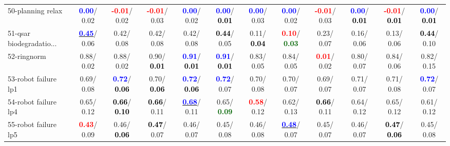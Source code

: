 \begin{table}[h]
\begin{center}
{\begin{tabular}{lc|c|c|c|c|c|c|c|c|c|c}
50-planning relax & \textcolor{blue}{\textbf{  0.00}}/  0.02 & \textcolor{red}{\textbf{ -0.01}}/  0.02 & \textcolor{red}{\textbf{ -0.01}}/  0.03 & \textcolor{blue}{\textbf{  0.00}}/  0.02 & \textcolor{blue}{\textbf{  0.00}}/\textcolor{black}{\textbf{  0.01}} & \textcolor{blue}{\textbf{  0.00}}/  0.03 & \textcolor{blue}{\textbf{  0.00}}/  0.02 & \textcolor{red}{\textbf{ -0.01}}/  0.03 & \textcolor{blue}{\textbf{  0.00}}/\textcolor{black}{\textbf{  0.01}} & \textcolor{red}{\textbf{ -0.01}}/\textcolor{black}{\textbf{  0.01}} & \textcolor{blue}{\textbf{  0.00}}/\textcolor{black}{\textbf{  0.01}} \\
51-qsar biodegradatio... & \underline{\textcolor{blue}{\textbf{  0.45}}}/  0.06 &   0.42/  0.08 &   0.42/  0.08 &   0.42/  0.08 & \textcolor{black}{\textbf{  0.44}}/  0.05 &   0.11/\textcolor{black}{\textbf{  0.04}} & \textcolor{red}{\textbf{  0.10}}/\textcolor{darkgreen}{\textbf{  0.03}} &   0.23/  0.07 &   0.16/  0.06 &   0.13/  0.06 & \textcolor{black}{\textbf{  0.44}}/  0.10 \\
52-ringnorm &   0.88/  0.02 &   0.88/  0.02 &   0.90/\textcolor{black}{\textbf{  0.01}} & \textcolor{blue}{\textbf{  0.91}}/\textcolor{black}{\textbf{  0.01}} & \textcolor{blue}{\textbf{  0.91}}/\textcolor{black}{\textbf{  0.01}} &   0.83/  0.05 &   0.84/  0.05 & \textcolor{red}{\textbf{  0.01}}/  0.02 &   0.80/  0.07 &   0.84/  0.06 &   0.82/  0.15 \\
53-robot failure lp1 &   0.69/  0.08 & \textcolor{blue}{\textbf{  0.72}}/\textcolor{black}{\textbf{  0.06}} &   0.70/\textcolor{black}{\textbf{  0.06}} & \textcolor{blue}{\textbf{  0.72}}/\textcolor{black}{\textbf{  0.06}} & \textcolor{blue}{\textbf{  0.72}}/  0.07 &   0.70/  0.08 &   0.70/  0.07 &   0.69/  0.07 &   0.71/  0.07 &   0.71/  0.08 & \textcolor{blue}{\textbf{  0.72}}/  0.07 \\ \hline
54-robot failure lp4 &   0.65/  0.12 & \textcolor{black}{\textbf{  0.66}}/\textcolor{black}{\textbf{  0.10}} & \textcolor{black}{\textbf{  0.66}}/  0.11 & \underline{\textcolor{blue}{\textbf{  0.68}}}/  0.11 &   0.65/\textcolor{darkgreen}{\textbf{  0.09}} & \textcolor{red}{\textbf{  0.58}}/  0.12 &   0.62/  0.13 & \textcolor{black}{\textbf{  0.66}}/  0.11 &   0.64/  0.12 &   0.65/  0.12 &   0.61/  0.12 \\
55-robot failure lp5 & \textcolor{red}{\textbf{  0.43}}/  0.09 &   0.46/\textcolor{black}{\textbf{  0.06}} & \textcolor{black}{\textbf{  0.47}}/  0.07 &   0.46/  0.07 &   0.45/  0.08 &   0.46/  0.08 & \underline{\textcolor{blue}{\textbf{  0.48}}}/  0.07 &   0.45/  0.07 &   0.46/  0.07 & \textcolor{black}{\textbf{  0.47}}/\textcolor{black}{\textbf{  0.06}} &   0.45/  0.08 \\

\end{tabular}}
\end{center}
\end{table}
